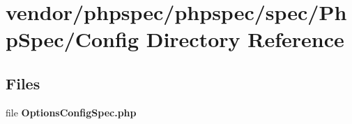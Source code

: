 \section{vendor/phpspec/phpspec/spec/\+Php\+Spec/\+Config Directory Reference}
\label{dir_c81460933ce214a8460b3b1be60038fe}
\subsection*{Files}
\begin{DoxyCompactItemize}
\item 
file {\bf Options\+Config\+Spec.\+php}
\end{DoxyCompactItemize}

